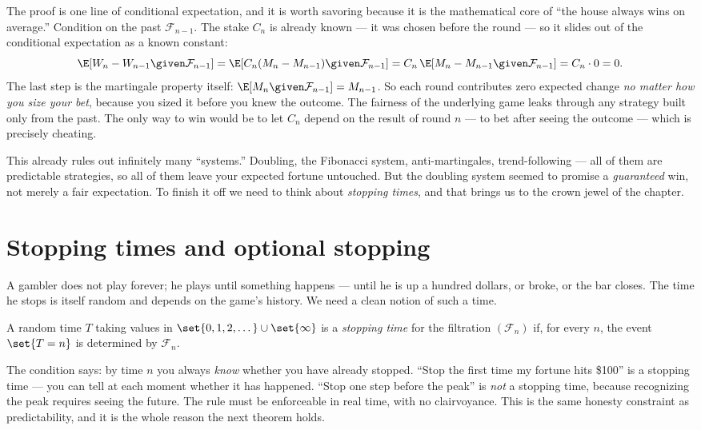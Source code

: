 \begin{whybox}
The proof is one line of conditional expectation, and it is worth savoring because it is the
mathematical core of ``the house always wins on average.'' Condition on the past $\mathcal{F}_{n-1}$.
The stake $C_n$ is already known --- it was chosen before the round --- so it slides out of the
conditional expectation as a known constant:
\[
  \E[W_n - W_{n-1}\given\mathcal{F}_{n-1}]
  = \E[C_n(M_n - M_{n-1})\given\mathcal{F}_{n-1}]
  = C_n\,\E[M_n - M_{n-1}\given\mathcal{F}_{n-1}]
  = C_n \cdot 0 = 0.
\]
The last step is the martingale property itself: $\E[M_n \given \mathcal{F}_{n-1}] = M_{n-1}$. So each
round contributes zero expected change \emph{no matter how you size your bet}, because you sized it
before you knew the outcome. The fairness of the underlying game leaks through any strategy built only
from the past. The only way to win would be to let $C_n$ depend on the result of round $n$ --- to bet
after seeing the outcome --- which is precisely cheating.
\end{whybox}

This already rules out infinitely many ``systems.'' Doubling, the Fibonacci system, anti-martingales,
trend-following --- all of them are predictable strategies, so all of them leave your expected fortune
untouched. But the doubling system seemed to promise a \emph{guaranteed} win, not merely a fair
expectation. To finish it off we need to think about \emph{stopping times}, and that brings us to the
crown jewel of the chapter.

\section{Stopping times and optional stopping}
\label{ch28:optional-stopping}

A gambler does not play forever; he plays until something happens --- until he is up a hundred dollars,
or broke, or the bar closes. The time he stops is itself random and depends on the game's history. We
need a clean notion of such a time.

\begin{definition}
\label{ch28:def-stopping}
A random time $T$ taking values in $\set{0,1,2,\dots} \cup \set{\infty}$ is a \emph{stopping time} for
the filtration $(\mathcal{F}_n)$ if, for every $n$, the event $\set{T = n}$ is determined by
$\mathcal{F}_n$.
\end{definition}

The condition says: by time $n$ you always \emph{know} whether you have already stopped. ``Stop the
first time my fortune hits \$100'' is a stopping time --- you can tell at each moment whether it has
happened. ``Stop one step before the peak'' is \emph{not} a stopping time, because recognizing the peak
requires seeing the future. The rule must be enforceable in real time, with no clairvoyance. This is
the same honesty constraint as predictability, and it is the whole reason the next theorem holds.

